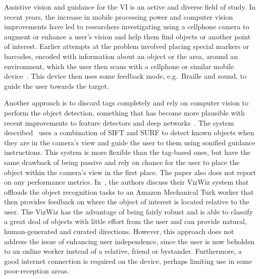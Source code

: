 \documentclass[a4paper, twoside]{article}
\begin{document}
\noindent Assistive vision and guidance for the VI is an active and diverse field of study. In recent years, the increase in mobile processing power and computer vision improvements have led to researchers investigating using a cellphone camera to augment or enhance a user's vision and help them find objects or another point of interest. Earlier attempts at the problem involved placing special markers or barcodes, encoded with information about an object or the area, around an environment, which the user then scans with a cellphone or similar mobile device~\cite{gude2013blind,iannizzotto2005badge3d,manduchi2012mobile}. This device then uses some feedback mode, e.g.\ Braille and sound, to guide the user towards the target. %

Another approach is to discard tags completely and rely on computer vision to perform the object detection, something that has become more plausible with recent improvements to feature detectors and deep networks~\cite{huang2017speed,redmon2016you}. The system described~\cite{schauerte2012assistive} uses a combination of SIFT and SURF to detect known objects when they are in the camera's view and guide the user to them using sonified guidance instructions. This system is more flexible than the tag-based ones, but have the same drawback of being passive and rely on chance for the user to place the object within the camera's view in the first place. The paper also does not report on any performance metrics. In~\cite{bigham2010vizwiz}, the authors discuss their VizWiz system that offloads the object recognition tasks to an Amazon Mechanical Turk worker that then provides feedback on where the object of interest is located relative to the user. The VizWiz has the advantage of being fairly robust and is able to classify a great deal of objects with little effort from the user and can provide natural, human-generated and curated directions. However, this approach does not address the issue of enhancing user independence, since the user is now beholden to an online worker instead of a relative, friend or bystander. Furthermore, a good internet connection is required on the device, perhaps limiting use in some poor-reception areas.
\end{document}
